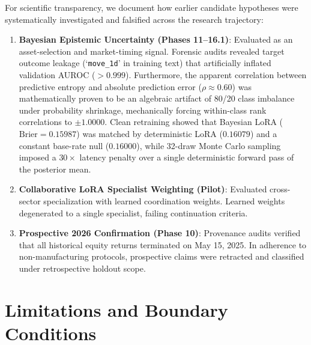 \documentclass[11pt,a4paper]{article}
\theoremstyle{definition}
\begin{document}
For scientific transparency, we document how earlier candidate hypotheses were systematically investigated and falsified across the research trajectory:
\begin{enumerate}
    \item \textbf{Bayesian Epistemic Uncertainty (Phases 11--16.1)}: Evaluated as an asset-selection and market-timing signal. Forensic audits revealed target outcome leakage (`\texttt{move\_1d}' in training text) that artificially inflated validation AUROC ($>0.999$). Furthermore, the apparent correlation between predictive entropy and absolute prediction error ($\rho \approx 0.60$) was mathematically proven to be an algebraic artifact of 80/20 class imbalance under probability shrinkage, mechanically forcing within-class rank correlations to $\pm 1.0000$. Clean retraining showed that Bayesian LoRA ($\text{Brier} = 0.15987$) was matched by deterministic LoRA ($0.16079$) and a constant base-rate null ($0.16000$), while 32-draw Monte Carlo sampling imposed a $30\times$ latency penalty over a single deterministic forward pass of the posterior mean.
    \item \textbf{Collaborative LoRA Specialist Weighting (Pilot)}: Evaluated cross-sector specialization with learned coordination weights. Learned weights degenerated to a single specialist, failing continuation criteria.
    \item \textbf{Prospective 2026 Confirmation (Phase 10)}: Provenance audits verified that all historical equity returns terminated on May 15, 2025. In adherence to non-manufacturing protocols, prospective claims were retracted and classified under retrospective holdout scope.
\end{enumerate}


\section{Limitations and Boundary Conditions}
\label{sec:limitations}
\end{document}
